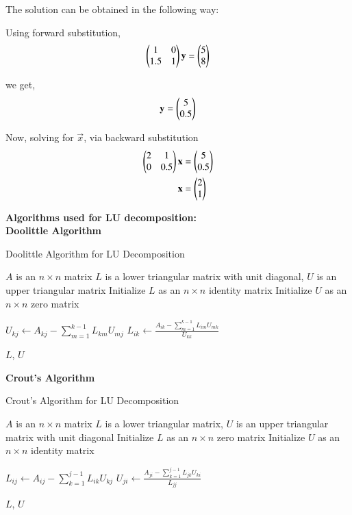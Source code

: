 \documentclass[journal]{IEEEtran}
\numberwithin{equation}{enumi}
\numberwithin{figure}{enumi}
\begin{document}
The solution can be obtained in the following way:

Using forward substitution,
\begin{align}
    \begin{pmatrix}1 & 0\\ 1.5 & 1\end{pmatrix}\mathbf{y} = \begin{pmatrix}5 \\ 8\end{pmatrix}
\end{align}

we get,
\begin{align}
    \mathbf{y} = \begin{pmatrix}5 \\ 0.5\end{pmatrix}
\end{align}

Now, solving for $\vec{x}$, via backward substitution
\begin{align}
    \begin{pmatrix}2 & 1 \\ 0 & 0.5\end{pmatrix}\mathbf{x} &= \begin{pmatrix}5 \\ 0.5\end{pmatrix}\\
    \mathbf{x} &= \begin{pmatrix}2 \\ 1\end{pmatrix}
\end{align}

\newpage
\textbf{Algorithms used for LU decomposition:}\\

\textbf{Doolittle Algorithm}
\begin{algorithm}
\caption{Doolittle Algorithm for LU Decomposition}
\label{doolittle}
\begin{algorithmic}[1]
\Require $A$ is an $n \times n$ matrix
\Ensure $L$ is a lower triangular matrix with unit diagonal, $U$ is an upper triangular matrix
\State Initialize $L$ as an $n \times n$ identity matrix
\State Initialize $U$ as an $n \times n$ zero matrix

        \State $U_{kj} \gets A_{kj} - \sum_{m=1}^{k-1} L_{km} U_{mj}$
    \EndFor
        \State $L_{ik} \gets \frac{A_{ik} - \sum_{m=1}^{k-1} L_{im} U_{mk}}{U_{kk}}$
    \EndFor
\EndFor

\State \Return $L$, $U$
\end{algorithmic}
\end{algorithm}

\textbf{Crout's Algorithm}
\begin{algorithm}
\caption{Crout's Algorithm for LU Decomposition}
\label{crout}
\begin{algorithmic}[1]
\Require $A$ is an $n \times n$ matrix
\Ensure $L$ is a lower triangular matrix, $U$ is an upper triangular matrix with unit diagonal
\State Initialize $L$ as an $n \times n$ zero matrix
\State Initialize $U$ as an $n \times n$ identity matrix

        \State $L_{ij} \gets A_{ij} - \sum_{k=1}^{j-1} L_{ik} U_{kj}$
    \EndFor
        \State $U_{ji} \gets \frac{A_{ji} - \sum_{k=1}^{j-1} L_{jk} U_{ki}}{L_{jj}}$
    \EndFor
\EndFor

\State \Return $L$, $U$
\end{algorithmic}
\end{algorithm}
\end{document}
